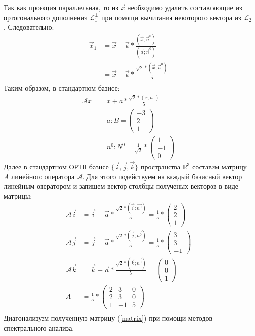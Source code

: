 \documentclass[12pt, a4paper]{article}
\begin{document}
Так как проекция параллельная, то из $\vec{x}$ необходимо удалить составляющие из ортогонального дополнения $\mathcal{L}_1^{\perp}$ при помощи вычитания некоторого вектора из $\mathcal{L}_2$. Следовательно:
\begin{equation*}
\begin{aligned}
\vec{x}_1& = \vec{x}-\vec{a}*\frac{(\vec{x};\vec{n}^0)}{(\vec{a};\vec{n}^0)}\\
&=\vec{x}+\vec{a}*\frac{\sqrt{2}*(\vec{x};\vec{n}^0)}{5}\\
\end{aligned}
\end{equation*}
Таким образом, в стандартном базисе:
\begin{equation*}
\begin{aligned}
\mathcal{A}x = &x+a*\frac{\sqrt{2}*(x;n^0)}{5}\\
&a: B= \begin{pmatrix}
-3\\
2\\
1
\end{pmatrix} \\
& n^0: N^0 = \frac{1}{\sqrt{2}}* \begin{pmatrix}
1\\
-1\\
0
\end{pmatrix}
\end{aligned}
\end{equation*}
Далее в стандартном ОРТН базисе $\{\vec{i},\vec{j},\vec{k}\}$ пространства $\mathbb{R}^3$ составим матрицу $A$ линейного оператора $\mathcal{A}$. Для этого подействуем на каждый базисный вектор линейным оператором и запишем вектор-столбцы полученых векторов в виде матрицы:
\begin{equation}\label{matrix}
\begin{aligned}
\mathcal{A}\vec{i} &= \vec{i}+\vec{a}*\frac{\sqrt{2}*(\vec{i};\vec{n^0})}{5} = \frac{1}{5} * \begin{pmatrix}
2\\
2\\
1
\end{pmatrix}\\
\mathcal{A}\vec{j} &= \vec{j}+\vec{a}*\frac{\sqrt{2}*(\vec{j};\vec{n^0})}{5} = \frac{1}{5} * \begin{pmatrix}
3\\
3\\
-1
\end{pmatrix}\\
\mathcal{A}\vec{k} &= \vec{k}+\vec{a}*\frac{\sqrt{2}*(\vec{k};\vec{n^0})}{5} = \begin{pmatrix}
0\\
0\\
1
\end{pmatrix}\\
A&=\frac{1}{5}*\begin{pmatrix}
2 & 3 & 0\\
2 & 3 & 0\\
1 & -1 & 5
\end{pmatrix}\\
\end{aligned}
\end{equation}
Диагонализуем полученную матрицу (\ref{matrix}) при помощи методов спектрального анализа.
\end{document}

